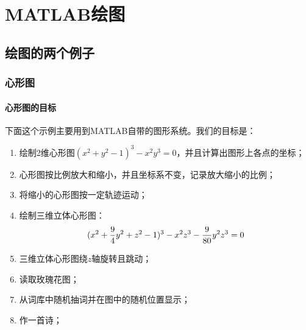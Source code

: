 ﻿%

\chapter{MATLAB绘图}
\section{绘图的两个例子}
    \subsection{心形图}
        \subsubsection{心形图的目标}
            \par
            下面这个示例主要用到MATLAB自带的图形系统。我们的目标是：
            \begin{enumerate}
            \item 绘制2维心形图$(x^2+y^2-1)^3-x^2y^3=0$，并且计算出图形上各点的坐标；
            \item 心形图按比例放大和缩小，并且坐标系不变，记录放大缩小的比例；
            \item 将缩小的心形图按一定轨迹运动；
            \item 绘制三维立体心形图：
            \begin{equation*}
            \centering
            (x^2+\frac 94 y^2+z^2-1)^3-x^2z^3-\frac {9}{80}y^2z^3=0
             \end{equation*}
            \item 三维立体心形图绕$z$轴旋转且跳动；
            \item 读取玫瑰花图；
            \item 从词库中随机抽词并在图中的随机位置显示；
            \item 作一首诗；
            \end{enumerate}
